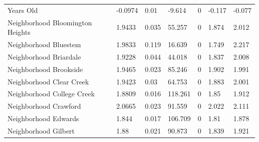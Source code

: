 \documentclass{article}
\begin{document}
\begin{table}[H]
\begin{tabular}{lllllll}
		Years Old                        & -0.0974                   & 0.01                         & -9.614                 & 0                                       & -0.117                        & -0.077                        \\
		Neighborhood Bloomington Heights & 1.9433                    & 0.035                        & 55.257                 & 0                                       & 1.874                         & 2.012                         \\
		Neighborhood Bluestem            & 1.9833                    & 0.119                        & 16.639                 & 0                                       & 1.749                         & 2.217                         \\
		Neighborhood Briardale           & 1.9228                    & 0.044                        & 44.018                 & 0                                       & 1.837                         & 2.008                         \\
		Neighborhood Brookside           & 1.9465                    & 0.023                        & 85.246                 & 0                                       & 1.902                         & 1.991                         \\
		Neighborhood Clear Creek         & 1.9423                    & 0.03                         & 64.753                 & 0                                       & 1.883                         & 2.001                         \\
		Neighborhood College Creek       & 1.8809                    & 0.016                        & 118.261                & 0                                       & 1.85                          & 1.912                         \\
		Neighborhood Crawford            & 2.0665                    & 0.023                        & 91.559                 & 0                                       & 2.022                         & 2.111                         \\
		Neighborhood Edwards             & 1.844                     & 0.017                        & 106.709                & 0                                       & 1.81                          & 1.878                         \\
		Neighborhood Gilbert             & 1.88                      & 0.021                        & 90.873                 & 0                                       & 1.839                         & 1.921                         \\

\end{tabular}
\end{table}
\end{document}
